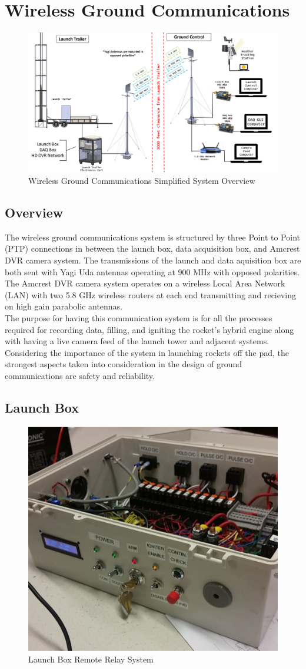 \documentclass[10pt,a4paper]{article}
\begin{document}
\section{Wireless Ground Communications}
\begin{figure}[h!]
	\centering
	\includegraphics[width=1\textwidth]{./figs/GroundComsOverview.jpg}
	\caption{Wireless Ground Communications Simplified System Overview}
	\label{fig:example}
\end{figure}


\subsection{Overview}
The wireless ground communications system is structured by three Point to Point (PTP) connections in between the launch box, data acquisition box, and Amcrest DVR camera system. The transmissions of the launch and data aquisition box are both sent with Yagi Uda antennas operating at 900 MHz with opposed polarities. The Amcrest DVR camera system operates on a wireless Local Area Network (LAN) with two 5.8 GHz wireless routers at each end transmitting and recieving on high gain parabolic antennas.\\
The purpose for having this communication system is for all the processes required for recording data, filling, and igniting the rocket's hybrid engine along with having a live camera feed of the launch tower and adjacent systems. Considering the importance of the system in launching rockets off the pad, the strongest aspects taken into consideration in the design of ground communications are safety and reliability.

\subsection{Launch Box}
\begin{figure}[h!]
	\centering
	\includegraphics[width=.3\textwidth]{./figs/LaunchBox.jpg}
	\caption{Launch Box Remote Relay System}
	\label{fig:example}
\end{figure}
\end{document}
